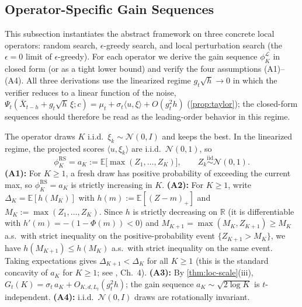 \subsection{Operator-Specific Gain Sequences}
\label{sec:operator-gain}
%
This subsection instantiates the abstract framework on three concrete local operators: random search, $\epsilon$-greedy search, and local perturbation search (the $\epsilon=0$ limit of $\epsilon$-greedy). For each operator we derive the gain sequence $\phi_K^{\mathcal{L}}$ in closed form (or as a tight lower bound) and verify the four assumptions (A1)--(A4). All three derivations use the linearized regime $g_t\sqrt{h} \to 0$ in which the verifier reduces to a linear function of the noise, $\Psi_t(\bar{X}_{t-h} + g_t\sqrt{h}\,\xi; c) = \mu_t + \sigma_t \langle u, \xi\rangle + O(g_t^2 h)$ (\cref{prop:taylor}); the closed-form sequences should therefore be read as the leading-order behavior in this regime.
%
\begin{example}
\label{ex:random-search}
The operator draws $K$ i.i.d.\ $\xi_k \sim \mathcal{N}(0, I)$ and keeps the best. In the linearized regime, the projected scores $\langle u, \xi_k\rangle$ are i.i.d.\ $\mathcal{N}(0,1)$, so
\begin{equation}
  \phi_K^{\mathrm{RS}} = a_K := \mathbb{E}\bigl[\max(Z_1, \ldots, Z_K)\bigr],
  \qquad Z_k \stackrel{\mathrm{iid}}{\sim} \mathcal{N}(0, 1).
  \label{eq:phi-rs}
\end{equation}
\textbf{(A1):} For $K \ge 1$, a fresh draw has positive probability of exceeding the current max, so $\phi_K^{\mathrm{RS}} = a_K$ is strictly increasing in $K$. \textbf{(A2):} For $K \ge 1$, write $\Delta_K = \mathbb{E}[h(M_K)]$ with $h(m) := \mathbb{E}[(Z-m)_+]$ and $M_K := \max(Z_1, \ldots, Z_K)$. Since $h$ is strictly decreasing on $\mathbb{R}$ (it is differentiable with $h'(m) = -(1-\Phi(m)) < 0$) and $M_{K+1} = \max(M_K, Z_{K+1}) \ge M_K$ a.s.\ with strict inequality on the positive-probability event $\{Z_{K+1} > M_K\}$, we have $h(M_{K+1}) \le h(M_K)$ a.s.\ with strict inequality on the same event. Taking expectations gives $\Delta_{K+1} < \Delta_K$ for all $K \ge 1$ (this is the standard concavity of $a_K$ for $K \ge 1$; see \citealt{david2003order}, Ch.~4). \textbf{(A3):} By \cref{thm:loc-scale}\textup{(iii)}, $G_t(K) = \sigma_t\,a_K + O_{K,d,L_t}(g_t^2 h)$; the gain sequence $a_K \sim \sqrt{2\log K}$ is $t$-independent. \textbf{(A4):} i.i.d.\ $\mathcal{N}(0, I)$ draws are rotationally invariant.
\end{example}
%
